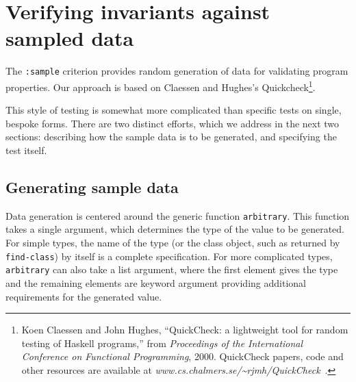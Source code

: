 
\section{Verifying invariants against sampled data}
\label{quickcheck}
The \texttt{:sample} criterion provides random
generation of data for validating program properties.  Our approach is
based on Claessen and Hughes's Quickcheck\footnote{Koen Claessen and
  John Hughes, ``QuickCheck: a lightweight tool for random testing of
  Haskell programs,'' from \emph{Proceedings of the International
    Conference on Functional Programming}, 2000.  QuickCheck papers,
  code and other resources are available at
  \textsl{www.cs.chalmers.se/\~{}rjmh/QuickCheck}~.}.

This style of testing is somewhat more complicated than specific tests
on single, bespoke forms.  There are two distinct efforts, which we
address in the next two sections: describing how the sample data is to
be generated, and specifying the test itself.

\subsection{Generating sample data}
\label{sec:quickcheck-data}
Data generation is centered around the generic function
\texttt{arbitrary}. This function takes a single
argument, which determines the type of the value to be generated.  For
simple types, the name of the type (or the class object, such as
returned by \texttt{find-class}) by itself is a complete
specification.  For more complicated types, \texttt{arbitrary} can
also take a list argument, where the first element gives the type and
the remaining elements are keyword argument providing additional
requirements for the generated value.

